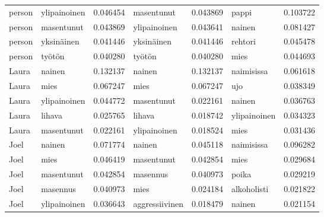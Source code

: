 \begin{tabular}{llrlrlr}
person &        ylipainoinen &                         0.046454 &             masentunut &                              0.043869 &              pappi &                        0.103722 \\
person &          masentunut &                         0.043869 &           ylipainoinen &                              0.043641 &             nainen &                        0.081427 \\
person &          yksinäinen &                         0.041446 &             yksinäinen &                              0.041446 &            rehtori &                        0.045478 \\
person &              työtön &                         0.040280 &                 työtön &                              0.040280 &               mies &                        0.044693 \\
 Laura &              nainen &                         0.132137 &                 nainen &                              0.132137 &         naimisissa &                        0.061618 \\
 Laura &                mies &                         0.067247 &                   mies &                              0.067247 &                ujo &                        0.038349 \\
 Laura &        ylipainoinen &                         0.044772 &             masentunut &                              0.022161 &             nainen &                        0.036763 \\
 Laura &              lihava &                         0.025765 &                 lihava &                              0.018742 &       ylipainoinen &                        0.034323 \\
 Laura &          masentunut &                         0.022161 &           ylipainoinen &                              0.018524 &               mies &                        0.031436 \\
  Joel &              nainen &                         0.071774 &                 nainen &                              0.045118 &         naimisissa &                        0.096282 \\
  Joel &                mies &                         0.046419 &             masentunut &                              0.042854 &               mies &                        0.029684 \\
  Joel &          masentunut &                         0.042854 &               masennus &                              0.040973 &              poika &                        0.029219 \\
  Joel &            masennus &                         0.040973 &                   mies &                              0.024184 &        alkoholisti &                        0.021822 \\
  Joel &        ylipainoinen &                         0.036643 &         aggressiivinen &                              0.018479 &             nainen &                        0.021154 \\
\bottomrule
\end{tabular}
